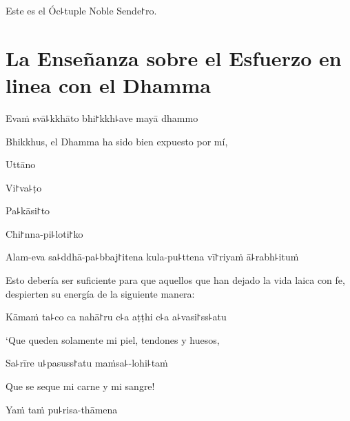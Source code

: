 \begin{english}
	Este es el Óc꜕tuple Noble Sende꜓ro.
\end{english}

\chapter[Esfuerzo en linea con el Dhamma]{La Enseñanza sobre el Esfuerzo en linea con el Dhamma}



\begin{leader}
\end{leader}

Evaṁ svā꜕kkhāto bhi꜓kkh꜕ave mayā dhammo

\begin{english}
	Bhikkhus, el Dhamma ha sido bien expuesto por mí,
\end{english}

Uttāno


Vi꜓va꜕ṭo


Pa꜕kāsi꜓to


Chi꜓nna-pi꜕loti꜓ko


Alam-eva sa꜕ddhā-pa꜕bbaj꜓itena kula-pu꜕ttena vī꜓riyaṁ ā꜕rabh꜕ituṁ

\begin{english}
	Esto debería ser suficiente para que aquellos que han dejado la vida laica con fe, despierten su energía de la siguiente manera:
\end{english}

Kāmaṁ ta꜕co ca nahā꜓ru c꜕a aṭṭhi c꜕a a꜕vasi꜓ss꜕atu

\begin{english}
	`Que queden solamente mi piel, tendones y huesos,
\end{english}

Sa꜕rīre u꜕pasuss꜓atu maṁsa꜕-lohi꜕taṁ

\begin{english}
	Que se seque mi carne y mi sangre!
\end{english}

Yaṁ taṁ pu꜕risa-thāmena

